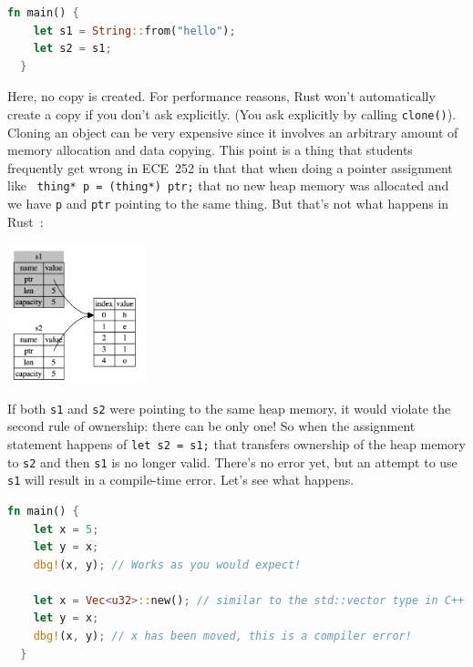 \documentclass[a4paper]{report}
\begin{document}
\begin{lstlisting}[language=Rust]
  fn main() {
    let s1 = String::from("hello");
    let s2 = s1;
  }
\end{lstlisting}

Here, no copy is created. For performance reasons, Rust won't automatically create a copy if you don't ask explicitly. (You ask explicitly by calling \texttt{clone()}). Cloning an object can be very expensive since it involves an arbitrary amount of memory allocation and data copying. This point is a thing that students frequently get wrong in ECE~252 in that that when doing a pointer assignment like \texttt{ thing* p = (thing*) ptr;} that no new heap memory was allocated and we have \texttt{p} and \texttt{ptr} pointing to the same thing. But that's not what happens in Rust~\cite{rustdocs}:

\begin{center}
\includegraphics[width=0.3\textwidth]{images/string-rust.png}
\end{center}

If both \texttt{s1} and \texttt{s2} were pointing to the same heap memory, it would violate the second rule of ownership: there can be only one! So when the assignment statement happens of \texttt{let s2 = s1;} that transfers ownership of the heap memory to \texttt{s2} and then \texttt{s1} is no longer valid. There's no error yet, but an attempt to use \texttt{s1} will result in a compile-time error. Let's see what happens.

\begin{lstlisting}[language=Rust]
  fn main() {
    let x = 5;
    let y = x;
    dbg!(x, y); // Works as you would expect!

    let x = Vec<u32>::new(); // similar to the std::vector type in C++
    let y = x;
    dbg!(x, y); // x has been moved, this is a compiler error!
  }
\end{lstlisting}
\end{document}
